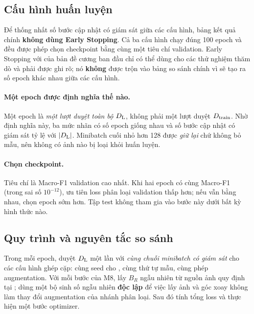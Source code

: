 \subsection{Cấu hình huấn luyện}
\label{sec:train-config}

Để thống nhất số bước cập nhật có giám sát giữa các cấu hình, bảng kết quả chính
\textbf{không dùng Early Stopping}. Cả ba cấu hình chạy đúng 100 epoch và đều được phép chọn
checkpoint bằng cùng một tiêu chí validation. Early Stopping với  của bản
đề cương ban đầu chỉ có thể dùng cho các thử nghiệm thăm dò và phải được ghi rõ; nó
\textbf{không} được trộn vào bảng so sánh chính vì sẽ tạo ra số epoch khác nhau giữa các cấu
hình.



\paragraph{Một epoch được định nghĩa thế nào.}
Một epoch là \emph{một lượt duyệt toàn bộ $D_{\mathrm{L}}$}, không phải một lượt duyệt $D_{\mathrm{train}}$. Nhờ định
nghĩa này, ba mức nhãn có số epoch giống nhau và số bước cập nhật có giám sát tỷ lệ với
$|D_{\mathrm{L}}|$. Minibatch cuối nhỏ hơn 128 được \emph{giữ lại} chứ không bỏ mẫu, nên không có ảnh nào
bị loại khỏi huấn luyện.

\paragraph{Chọn checkpoint.} Tiêu chí là Macro-F1 validation cao nhất. Khi hai epoch có cùng
Macro-F1 (trong sai số $10^{-12}$), ưu tiên loss phân loại validation thấp hơn; nếu vẫn bằng
nhau, chọn epoch sớm hơn. Tập test không tham gia vào bước này dưới bất kỳ hình thức nào.

\subsection{Quy trình và nguyên tắc so sánh}
\label{sec:exp-compare}

Trong mỗi epoch, duyệt $D_{\mathrm{L}}$ một lần với \emph{cùng chuỗi minibatch có giám sát} cho các cấu
hình ghép cặp: cùng seed cho , cùng thứ tự mẫu, cùng phép augmentation. Với mỗi
bước của M8, lấy $B_R$ ngẫu nhiên từ nguồn ảnh quy định tại ; dùng một bộ
sinh số ngẫu nhiên \textbf{độc lập} để việc lấy ảnh và góc xoay không làm thay đổi augmentation
của nhánh phân loại. Sau đó tính tổng loss và thực hiện một bước optimizer.

